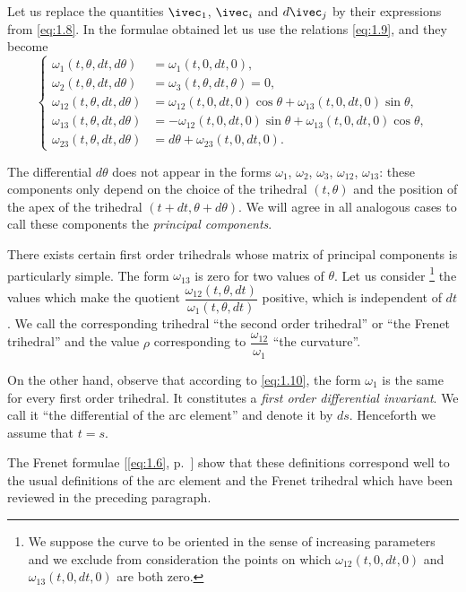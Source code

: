 Let us replace the quantities $\ivec_{1}$, $\ivec_{i}$ and $d\ivec_{j}$ by their expressions from \eqref{eq:1.8}. In the formulae obtained let us use the relations \eqref{eq:1.9}, and they become
\begin{equation}
  \label{eq:1.10}
  \left\{
    \begin{aligned}
      \omega_{1}(t,\theta,dt,d\theta)&=\omega_{1}(t,0,dt,0),\\
      \omega_{2}(t,\theta,dt,d\theta)&=\omega_{3}(t,\theta,dt,\theta)=0,\\
      \omega_{12}(t,\theta,dt,d\theta)&=\omega_{12}(t,0,dt,0)\cos\theta+\omega_{13}(t,0,dt,0)\sin\theta,\\
      \omega_{13}(t,\theta,dt,d\theta)&=-\omega_{12}(t,0,dt,0)\sin\theta+\omega_{13}(t,0,dt,0)\cos\theta,\\
      \omega_{23}(t,\theta,dt,d\theta)&=d\theta+\omega_{23}(t,0,dt,0).
    \end{aligned}
  \right.
\end{equation}

The differential $d\theta$ does not appear in the forms $\omega_{1}$, $\omega_{2}$, $\omega_{3}$, $\omega_{12}$, $\omega_{13}$: these components only depend on the choice of the trihedral $(t,\theta)$ and the position of the apex of the trihedral $(t+dt,\theta+d\theta)$. We will agree in all analogous cases to call these components the \emph{principal components}.

There exists certain first order trihedrals whose matrix of principal components is particularly simple. The form $\omega_{13}$ is zero for two values of $\theta$. Let us consider \footnote{We suppose the curve to be oriented in the sense of increasing parameters and we exclude from consideration the points on which $\omega_{12}(t,0,dt,0)$ and $\omega_{13}(t,0,dt,0)$ are both zero.} the values which make the quotient $\dfrac{\omega_{12}(t,\theta,dt)}{\omega_{1}(t,\theta,dt)}$ positive, which is independent of $dt$. We call the corresponding trihedral ``the second order trihedral'' or ``the Frenet trihedral'' and the value $\rho$ corresponding to $\dfrac{\omega_{12}}{\omega_{1}}$ ``the curvature''.

On the other hand, observe that according to \eqref{eq:1.10}, the form $\omega_{1}$ is the same for every first order trihedral. It constitutes a \emph{first order differential invariant}. We call it ``the differential of the arc element'' and denote it by $ds$. Henceforth we assume that $t=s$.

The Frenet formulae [\eqref{eq:1.6}, p.~\pageref{eq:1.6}] show that these definitions correspond well to the usual definitions of the arc element and the Frenet trihedral which have been reviewed in the preceding paragraph.

